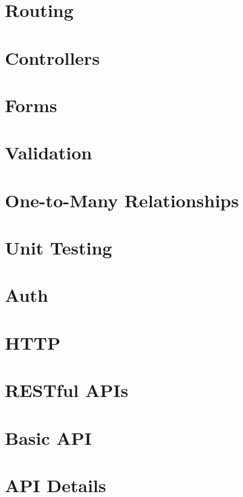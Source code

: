 \documentclass[b5paper,openany]{book}
\begin{document}
\chapter{Routing}


\chapter{Controllers}


\chapter{Forms}


\chapter{Validation}


\chapter{One-to-Many Relationships}


\chapter{Unit Testing}


\chapter{Auth}


\chapter{HTTP}


\chapter{RESTful APIs}


\chapter{Basic API}


\chapter{API Details}

\end{document}
